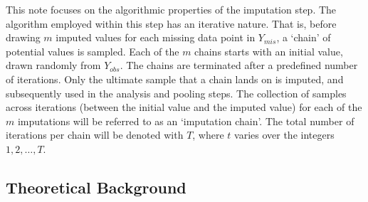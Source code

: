 \documentclass[article]{jss}
\begin{document}
This note focuses on the algorithmic properties of the imputation step. The algorithm employed within this step has an iterative nature. That is, before drawing $m$ imputed values for each missing data point in $Y_{mis}$, a `chain' of potential values is sampled. Each of the $m$ chains starts with an initial value, drawn randomly from $Y_{obs}$. The chains are terminated after a predefined number of iterations. Only the ultimate sample that a chain lands on is imputed, and subsequently used in the analysis and pooling steps. The collection of samples across iterations (between the initial value and the imputed value) for each of the $m$ imputations will be referred to as an `imputation chain'. The total number of iterations per chain will be denoted with $T$, where $t$ varies over the integers $1, 2, \dots, T$.


% 
% 

\subsection{Theoretical Background} \label{sec:background}
\end{document}
